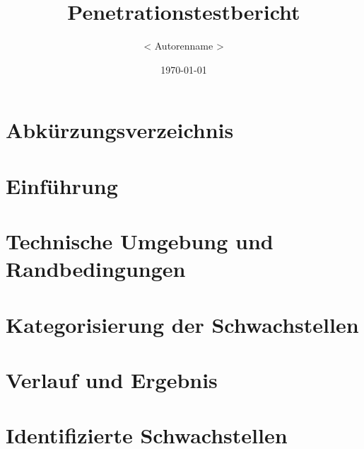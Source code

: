 \documentclass[a4paper]{report}
\title{Penetrationstestbericht}
\author{< Autorenname >}
\date{\today}
\begin{document}
\maketitle
\tableofcontents
\listoffigures

\chapter*{Abkürzungsverzeichnis}

\chapter{Einführung}


\chapter{Technische Umgebung und Randbedingungen}


\chapter{Kategorisierung der Schwachstellen}


\chapter{Verlauf und Ergebnis}


\chapter{Identifizierte Schwachstellen}
\end{document}

